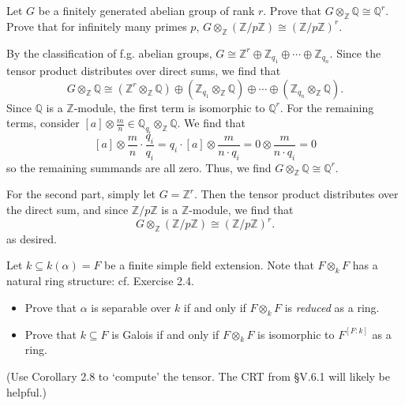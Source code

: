 \documentclass[../../master.tex]{subfiles}
\begin{document}
\begin{problem}
    Let $G$ be a finitely generated abelian group of rank $r$.
    Prove that $G \otimes_\mathbb{Z} \mathbb{Q} \cong \mathbb{Q}^{r}$.
    Prove that for infinitely many primes $p$, $G \otimes_\mathbb{Z} (\mathbb{Z} / p\mathbb{Z}) \cong (\mathbb{Z} / p\mathbb{Z})^{r}$.
\end{problem}

\begin{solution}
    By the classification of f.g. abelian groups, $G \cong \mathbb{Z}^{r} \oplus \mathbb{Z}_{q_1} \oplus \cdots \oplus \mathbb{Z}_{q_n}$.
    Since the tensor product distributes over direct sums, we find that
    \[
        G \otimes_\mathbb{Z} \mathbb{Q} \cong (\mathbb{Z}^{r} \otimes_\mathbb{Z} \mathbb{Q}) \oplus (\mathbb{Z}_{q_1} \otimes_\mathbb{Z} \mathbb{Q}) \oplus \cdots \oplus (\mathbb{Z}_{q_n} \otimes_\mathbb{Z} \mathbb{Q}).
    \]
    Since $\mathbb{Q}$ is a $\mathbb{Z}$-module, the first term is isomorphic to $\mathbb{Q}^{r}$.
    For the remaining terms, consider $[a] \otimes \frac{m}{n} \in \mathbb{Q}_{q_i} \otimes_\mathbb{Z} \mathbb{Q}$.
    We find that
    \[
        [a] \otimes \frac{m}{n} \cdot \frac{q_i}{q_i} = q_i \cdot [a] \otimes \frac{m}{n \cdot q_i} = 0 \otimes \frac{m}{n \cdot q_i} = 0
    \]
    so the remaining summands are all zero.
    Thus, we find $G \otimes_\mathbb{Z} \mathbb{Q} \cong \mathbb{Q}^{r}$.

    For the second part, simply let $G = \mathbb{Z}^{r}$.
    Then the tensor product distributes over the direct sum, and since $\mathbb{Z} / p\mathbb{Z}$ is a $\mathbb{Z}$-module, we find that
    \[
        G \otimes_\mathbb{Z} (\mathbb{Z}/p\mathbb{Z}) \cong (\mathbb{Z}/p\mathbb{Z})^{r}.
    \]
    as desired.
\end{solution}

\begin{problem}
    Let $k \subseteq k(\alpha) = F$ be a finite simple field extension.
    Note that $F \otimes_k F$ has a natural ring structure: cf. Exercise 2.4.
    \begin{itemize}
        \item Prove that $\alpha$ is separable over $k$ if and only if $F \otimes_k F$ is \textit{reduced} as a ring.
        \item Prove that $k \subseteq F$ is Galois if and only if $F \otimes_k F$ is isomorphic to $F^{[F : k]}$ as a ring.
    \end{itemize}
    (Use Corollary 2.8 to `compute' the tensor.
    The CRT from \S V.6.1 will likely be helpful.)
\end{problem}
\end{document}
